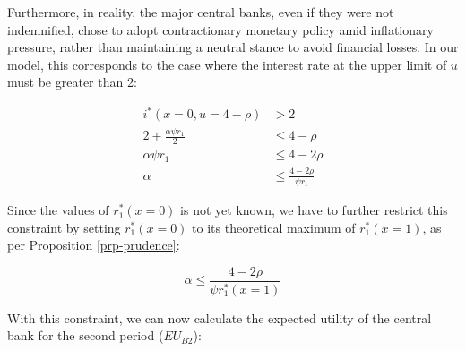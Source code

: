 \documentclass[
  a4paper,
  abstract=true]{scrartcl}
\theoremstyle{definition}
\begin{document}
Furthermore, in reality, the major central banks, even if they were not
indemnified, chose to adopt contractionary monetary policy amid
inflationary pressure, rather than maintaining a neutral stance to avoid
financial losses. In our model, this corresponds to the case where the
interest rate at the upper limit of \(u\) must be greater than 2:

\begin{align*}
i^*(x=0,u=4-\rho)&>2\\
2+\frac{\alpha\psi r_1}{2}&\leq4-\rho \\
\alpha\psi r_1&\leq4-2\rho \\
\alpha&\leq\frac{4-2\rho}{\psi r_1}
\end{align*}

Since the values of \(r_1^*(x=0)\) is not yet known, we have to further
restrict this constraint by setting \(r_1^*(x=0)\) to its theoretical
maximum of \(r_1^*(x=1)\), as per Proposition \ref{prp-prudence}:

\[
\alpha\leq\frac{4-2\rho}{\psi r_1^*(x=1)}
\]

With this constraint, we can now calculate the expected utility of the
central bank for the second period (\(EU_{B2}\)):
\end{document}
